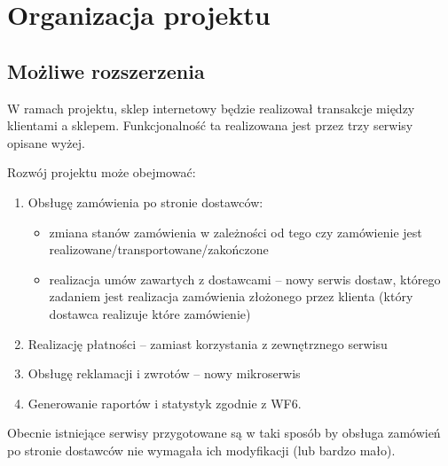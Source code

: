 \documentclass[11pt,a4paper,twoside]{article}
\begin{document}


\section{Organizacja projektu}
\subsection{Możliwe rozszerzenia}
W ramach projektu, sklep internetowy będzie realizował transakcje między klientami a sklepem. Funkcjonalność ta realizowana jest przez trzy serwisy opisane wyżej.

Rozwój projektu może obejmować:
\begin{enumerate}
\item Obsługę zamówienia po stronie dostawców:
\begin{itemize}
\item zmiana stanów zamówienia w zależności od tego czy zamówienie jest realizowane/transportowane/zakończone
\item realizacja umów zawartych z dostawcami -- nowy serwis dostaw, którego zadaniem jest realizacja zamówienia złożonego przez klienta (który dostawca realizuje które zamówienie)
\end{itemize}
\item Realizację płatności -- zamiast korzystania z zewnętrznego serwisu
\item Obsługę reklamacji i zwrotów -- nowy mikroserwis
\item Generowanie raportów i statystyk zgodnie z WF6.
\end{enumerate}

Obecnie istniejące serwisy przygotowane są w taki sposób by obsługa zamówień po stronie dostawców nie wymagała ich modyfikacji (lub bardzo mało).


\end{document}

